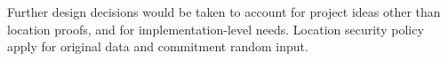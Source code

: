 \documentclass[a4paper,12pt]{article}
\begin{document}
Further design decisions would be taken
to account for project ideas other than location proofs,
and for implementation-level needs.
Location security policy apply for original data and commitment random input.

  
\end{document}
